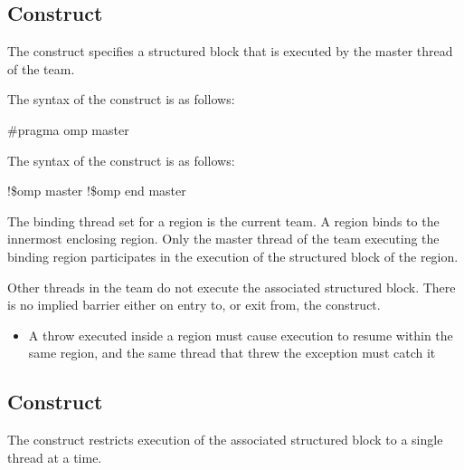 \subsection{ Construct}
\label{subsec:master Construct}
\summary
The  construct specifies a structured block that is executed by the master thread 
of the team.

\syntax
\ccppspecificstart
The syntax of the  construct is as follows:

\begin{boxedcode}
\#pragma omp master 
\end{boxedcode}
\ccppspecificend

\fortranspecificstart
The syntax of the  construct is as follows:

\begin{boxedcode}
!\$omp master
!\$omp end master
\end{boxedcode}
\fortranspecificend

\binding
The binding thread set for a  region is the current team. A  region 
binds to the innermost enclosing  region. Only the master thread of the team 
executing the binding  region participates in the execution of the structured 
block of the  region.

\descr
Other threads in the team do not execute the associated structured block. There is no 
implied barrier either on entry to, or exit from, the  construct.

\restrictions
\cppspecificstart
\begin{itemize}
\item A throw executed inside a  region must cause execution to resume within the 
same  region, and the same thread that threw the exception must catch it
\end{itemize}
\cppspecificend











\subsection{ Construct}
\label{subsec:critical Construct}
\summary
The  construct restricts execution of the associated structured block to a 
single thread at a time.

